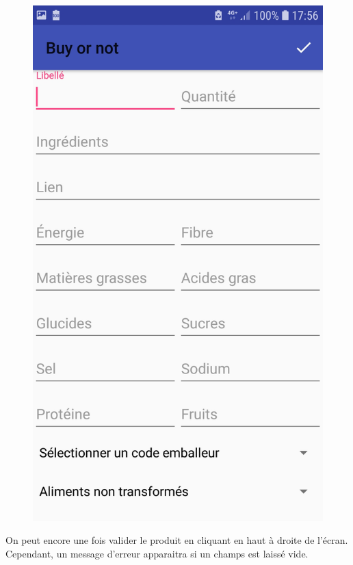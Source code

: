 \documentclass[report]{BetterDocument}
\begin{document}
	\begin{figure}[H]
		\centering\includegraphics[width=0.5\paperwidth, height=0.3\paperheight, keepaspectratio]{img/ajout.jpg}
	\end{figure}

	On peut encore une fois valider le produit en cliquant en haut à droite de l'écran. Cependant, un message d'erreur apparaitra si un champs est laissé vide.
\end{document}
